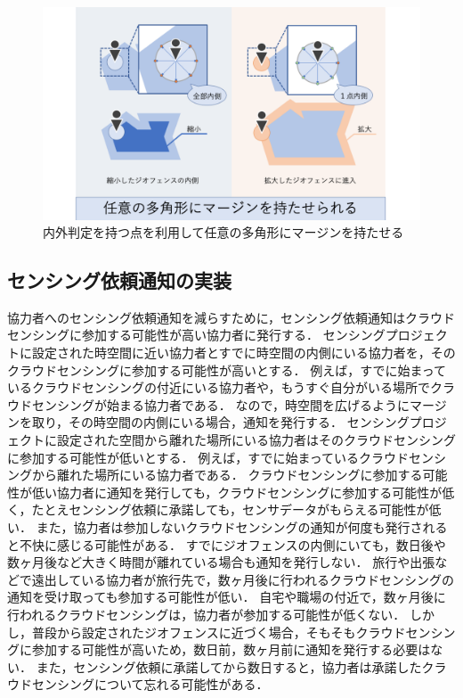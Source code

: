 \begin{figure}[tbh]
    \centering
    \includegraphics[width=16cm]{img_margin_2.2.png}
    \caption{内外判定を持つ点を利用して任意の多角形にマージンを持たせる}
    \label{fig:margin_2.2}
\end{figure}

\subsection{センシング依頼通知の実装}
\label{myApp_notify}
協力者へのセンシング依頼通知を減らすために，センシング依頼通知はクラウドセンシングに参加する可能性が高い協力者に発行する．
センシングプロジェクトに設定された時空間に近い協力者とすでに時空間の内側にいる協力者を，そのクラウドセンシングに参加する可能性が高いとする．
例えば，すでに始まっているクラウドセンシングの付近にいる協力者や，もうすぐ自分がいる場所でクラウドセンシングが始まる協力者である．
なので，時空間を広げるようにマージンを取り，その時空間の内側にいる場合，通知を発行する．
センシングプロジェクトに設定された空間から離れた場所にいる協力者はそのクラウドセンシングに参加する可能性が低いとする．
例えば，すでに始まっているクラウドセンシングから離れた場所にいる協力者である．
クラウドセンシングに参加する可能性が低い協力者に通知を発行しても，クラウドセンシングに参加する可能性が低く，たとえセンシング依頼に承諾しても，センサデータがもらえる可能性が低い．
また，協力者は参加しないクラウドセンシングの通知が何度も発行されると不快に感じる可能性がある．
すでにジオフェンスの内側にいても，数日後や数ヶ月後など大きく時間が離れている場合も通知を発行しない．
旅行や出張などで遠出している協力者が旅行先で，数ヶ月後に行われるクラウドセンシングの通知を受け取っても参加する可能性が低い．
自宅や職場の付近で，数ヶ月後に行われるクラウドセンシングは，協力者が参加する可能性が低くない．
しかし，普段から設定されたジオフェンスに近づく場合，そもそもクラウドセンシングに参加する可能性が高いため，数日前，数ヶ月前に通知を発行する必要はない．
また，センシング依頼に承諾してから数日すると，協力者は承諾したクラウドセンシングについて忘れる可能性がある．

